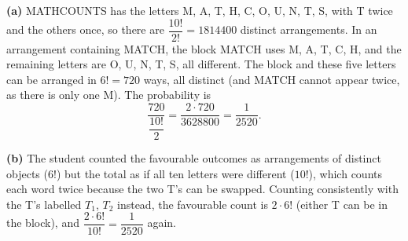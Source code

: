 \textbf{(a)} MATHCOUNTS has the letters M, A, T, H, C, O, U, N, T, S, with T twice and the others once, so there are $\dfrac{10!}{2!}=1814400$ distinct arrangements. In an arrangement containing MATCH, the block MATCH uses M, A, T, C, H, and the remaining letters are O, U, N, T, S, all different. The block and these five letters can be arranged in $6!=720$ ways, all distinct (and MATCH cannot appear twice, as there is only one M). The probability is
\[\dfrac{720}{\dfrac{10!}{2}}=\dfrac{2\cdot720}{3628800}=\boxed{\dfrac{1}{2520}}.\]

\textbf{(b)} The student counted the favourable outcomes as arrangements of distinct objects ($6!$) but the total as if all ten letters were different ($10!$), which counts each word twice because the two T's can be swapped. Counting consistently with the T's labelled $T_1$, $T_2$ instead, the favourable count is $2\cdot6!$ (either T can be in the block), and $\dfrac{2\cdot6!}{10!}=\dfrac{1}{2520}$ again.
